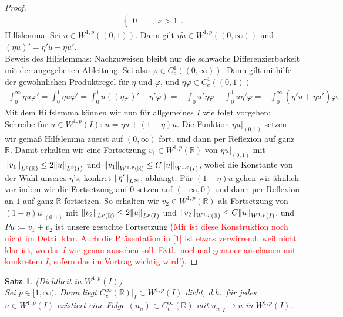 \documentclass[twoside]{article}
\newcounter{lecnum}
\newtheorem{theorem}{Satz}[lecnum]
\theoremstyle{definition}
\begin{document}
\begin{proof}
\begin{align*}
\begin{cases}
0 \quad &, \; x > 1
\end{cases}.
\end{align*}
Hilfslemma: Sei $u \in W^{1,p}((0,1))$. Dann gilt $\eta \tilde{u} \in W^{1,p}((0,\infty))$ und $(\eta \tilde{u})' = \eta' \tilde{u} + \eta \tilde{u'}$.\\
Beweis des Hilfslemmas: Nachzuweisen bleibt nur die schwache Differenzierbarkeit mit der angegebenen Ableitung. Sei also $\varphi \in C_c^1((0,\infty))$. Dann gilt mithilfe der gewöhnlichen Produktregel für $\eta$ und $\varphi$, und $\eta \varphi \in C_c^1((0,1))$
\begin{align*}
\int_0^\infty \eta \tilde{u} \varphi' = \int_0^1 \eta u \varphi' = \int_0^1 u ((\eta \varphi)' - \eta ' \varphi) = - \int_0^1 u' \eta \varphi - \int_0^1 u \eta' \varphi = - \int_0^\infty (\eta' \tilde{u} + \eta \tilde{u'}) \varphi.
\end{align*}
Mit dem Hilfslemma können wir nun für allgemeines $I$ wie folgt vorgehen: Schreibe für $u \in W^{1,p}(I)$: $u = \eta u + (1- \eta) u$. Die Funktion $\eta u|_{(0,1)}$ setzen wir gemäß Hilfslemma zuerst auf $(0,\infty)$ fort, und dann per Reflexion auf ganz $\mathbb{R}$. Damit erhalten wir eine Fortsetzung $v_1 \in W^{1,p}(\mathbb{R})$ von $\eta u|_{(0,1)}$ mit $\norm{v_1}_{L^p(\mathbb{R})} \leq 2 \norm{u}_{L^p(I)}$ und $\norm{v_1}_{W^{1,p}(\mathbb{R})} \leq C \norm{u}_{W^{1,p}(I)}$, wobei die Konstante von der Wahl unseres $\eta$'s, konkret $\norm{\eta'}_{L^\infty}$, abhängt.  Für $(1-\eta)u$ gehen wir ähnlich vor indem wir die Fortsetzung auf $0$ setzen auf $(-\infty,0)$ und dann per Reflexion an $1$ auf ganz $\mathbb{R}$ fortsetzen. So erhalten wir  $v_2 \in W^{1,p}(\mathbb{R})$ als Fortsetzung von $(1-\eta)u|_{(0,1)}$ mit $\norm{v_2}_{L^p(\mathbb{R})} \leq 2 \norm{u}_{L^p(I)}$ und $\norm{v_2}_{W^{1,p}(\mathbb{R})} \leq C \norm{u}_{W^{1,p}(I)}$, und $Pu := v_1 + v_2$ ist unsere gesuchte Fortsetzung (\textcolor{red}{Mir ist diese Konstruktion noch nicht im Detail klar. Auch die Präsentation in [1] ist etwas verwirrend, weil nicht klar ist, wo das $I$ wie genau aussehen soll. Evtl.\ nochmal genauer anschauen mit konkretem $I$, sofern das im Vortrag wichtig wird!}).
\end{proof}
\begin{theorem}(Dichtheit in $W^{1,p}(I)$) \label{thm:dicht}\\
Sei $p \in [1,\infty)$. Dann liegt $C_c^\infty(\mathbb{R})|_I \subset W^{1,p}(I)$ dicht, d.h.\ für jedes $u \in W^{1,p}(I)$ existiert eine Folge $(u_n)\subset C_c^\infty(\mathbb{R})$ mit $u_n|_I \to u$ in $W^{1,p}(I)$.
\end{theorem}
\end{document}
